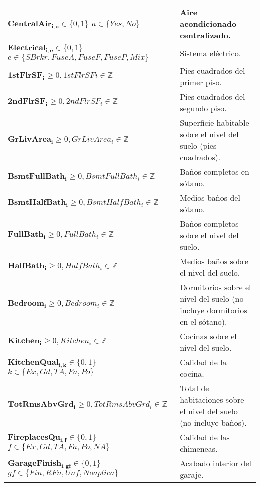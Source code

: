 \begin{longtable}{ | p{8cm} | p{5cm} | }
    \hline
    $\boldsymbol{CentralAir_{i,a}} \in \{0, 1\}$ \newline 
    $a \in \{Yes, No\}$ & Aire acondicionado centralizado.\\
    \hline
    $\boldsymbol{Electrical_{i,e}} \in \{0, 1\}$\newline 
    $e \in \{SBrkr, FuseA, FuseF, FuseP, Mix\}$ & Sistema eléctrico.\\
    \hline
    $\boldsymbol{1stFlrSF_{i}} \geq 0, 1stFlrSF{i} \in \mathbb{Z}$ & Pies cuadrados del primer piso.\\
    \hline
    $\boldsymbol{2ndFlrSF_{i}} \geq 0, 2ndFlrSF_{i} \in \mathbb{Z}$ & Pies cuadrados del segundo piso.\\
    \hline
    $\boldsymbol{GrLivArea_{i}} \geq 0, GrLivArea_{i} \in \mathbb{Z}$ & Superficie habitable sobre el nivel del suelo (pies cuadrados).\\
    \hline
    $\boldsymbol{BsmtFullBath_{i}} \geq 0, BsmtFullBath_{i} \in \mathbb{Z}$ & Baños completos en sótano.\\
    \hline
    $\boldsymbol{BsmtHalfBath_{i}} \geq 0, BsmtHalfBath_{i} \in \mathbb{Z}$ & Medios baños del sótano.\\
    \hline
    $\boldsymbol{FullBath_{i}} \geq 0, FullBath_{i} \in \mathbb{Z}$ & Baños completos sobre el nivel del suelo.\\
    \hline
    $\boldsymbol{HalfBath_{i}} \geq 0, HalfBath_{i} \in \mathbb{Z}$ & Medios baños sobre el nivel del suelo.\\
    \hline
    $\boldsymbol{Bedroom_{i}} \geq 0, Bedroom_{i} \in \mathbb{Z}$ & Dormitorios sobre el nivel del suelo (no incluye dormitorios en el sótano).\\
    \hline
    $\boldsymbol{Kitchen_{i} }\geq 0, Kitchen_{i} \in \mathbb{Z}$ & Cocinas sobre el nivel del suelo.\\
    \hline
    $\boldsymbol{KitchenQual_{i,k} }\in \{0, 1\}$\newline 
    $k \in \{Ex, Gd, TA, Fa, Po\}$  & Calidad de la cocina.\\
    \hline
    $\boldsymbol{TotRmsAbvGrd_{i}} \geq 0, TotRmsAbvGrd_{i} \in \mathbb{Z}$ & Total de habitaciones sobre el nivel del suelo (no incluye baños).\\
    \hline
    $\boldsymbol{FireplacesQu_{i,f}} \in \{0, 1\}$\newline 
    $f \in \{Ex, Gd, TA, Fa, Po, NA\}$ & Calidad de las chimeneas.\\
    \hline
    $\boldsymbol{GarageFinish_{i,gf}} \in \{0, 1\}$\newline $gf \in \{Fin, RFn, Unf, No aplica\}$ & Acabado interior del garaje.\\

\end{longtable}
